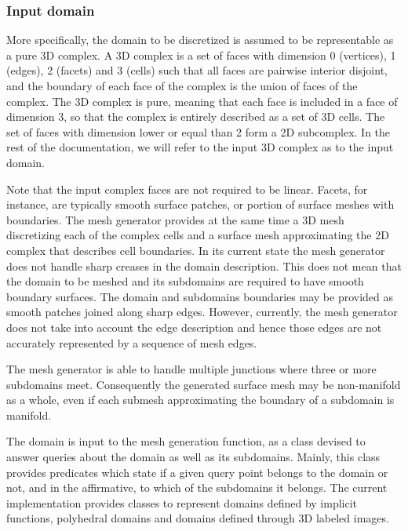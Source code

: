 \subsubsection{Input domain}

More specifically, the domain to be discretized is assumed
 to be representable as a pure
3D complex. A 3D complex is a set of faces with dimension
0 (vertices), 1 (edges), 2 (facets) and 3 (cells) such that
all faces are pairwise interior disjoint, 
and the boundary of each face of the complex is the union of faces
of the complex.
The 3D complex is pure, meaning that each face is included in a face of dimension 3,
so that the complex is entirely described as a set of 3D cells.
The set of faces with dimension lower or equal than 2 form a 2D
subcomplex. In the rest of the documentation, we will refer to the
input 3D complex as to the input domain.


Note that the input complex faces are not required to be linear. 
Facets, for instance, are typically smooth surface patches, 
or portion of surface meshes with boundaries.
The mesh generator provides at the same time
a 3D mesh discretizing each of the complex cells
and a surface mesh approximating the 2D complex 
that describes cell boundaries.
In its current state the mesh generator does not handle
sharp creases in the domain description. This does not mean  that 
the domain to be meshed  and its subdomains
are required to have smooth boundary surfaces.  The domain 
and  subdomains  boundaries  may be provided
 as smooth patches joined  along sharp edges.
However, currently, the mesh generator
 does  not take into account  the  edge description and hence
those edges are not  accurately  represented by a sequence of  mesh edges.


The mesh generator is able to handle
multiple junctions where three or more subdomains meet.
Consequently  the generated surface mesh may be non-manifold
as a whole, even if each  submesh approximating the boundary of a subdomain
is manifold.




The domain is input to the mesh generation function,
as a class 
devised to  answer queries about the domain as well as its subdomains.
Mainly, this class provides predicates which state
if  a given query point belongs 
to the domain or not, 
and in the affirmative, to which of the subdomains it belongs.
The current implementation provides  classes to represent
domains defined by implicit functions, polyhedral domains
and domains defined through 3D labeled images.

